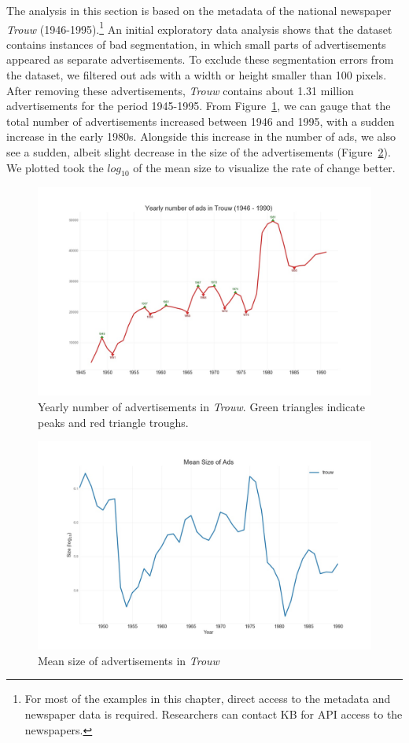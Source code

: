 \documentclass[USenglish]{article}
\begin{document}
The analysis in this section is based on the metadata of the national newspaper \textit{Trouw} (1946-1995).\footnote{For most of the examples in this chapter, direct access to the metadata and newspaper data is required. Researchers can contact KB for API access to the newspapers.} An initial exploratory data analysis shows that the dataset contains instances of bad segmentation, in which small parts of advertisements appeared as separate advertisements. To exclude these segmentation errors from the dataset, we filtered out ads with a width or height smaller than 100 pixels. After removing these advertisements, \textit{Trouw} contains about 1.31 million advertisements for the period 1945-1995. From Figure~\ref{fig:ad_curve}, we can gauge that the total number of advertisements increased between 1946 and 1995, with a sudden increase in the early 1980s. Alongside this increase in the number of ads, we also see a sudden, albeit slight decrease in the size of the advertisements (Figure~\ref{fig:mean_size}). We plotted took the $log_{10}$ of the mean size to visualize the rate of change better. 

\begin{figure}%
  \centering
  \includegraphics[width=.9\textwidth]{figures/Trouw_ad_curve}%
  \caption{Yearly number of advertisements in \textit{Trouw}. Green triangles indicate peaks and red triangle troughs.}%
  \label{fig:ad_curve}%
\end{figure}

\begin{figure}%
  \centering
  \includegraphics[width=.9\textwidth]{figures/mean_size}%
  \caption{Mean size of advertisements in \textit{Trouw}}
  \label{fig:mean_size}%
\end{figure}
\end{document}
